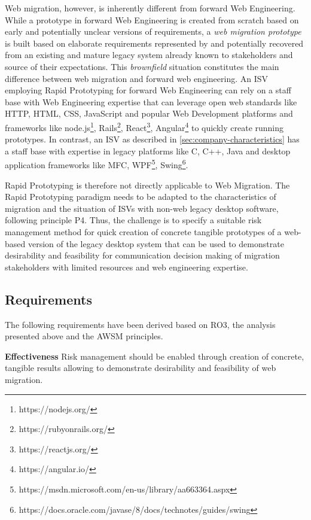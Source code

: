 Web migration, however, is inherently different from forward Web Engineering.
While a prototype in forward Web Engineering is created from scratch based on early and potentially unclear versions of requirements, a \emph{web migration prototype} is built based on elaborate requirements represented by and potentially recovered from an existing and mature legacy system already known to stakeholders and source of their expectations.
This \emph{brownfield} \autocite{Hopkins2008Brownfield} situation constitutes the main difference between web migration and forward web engineering.
An ISV employing Rapid Prototyping for forward Web Engineering can rely on a staff base with Web Engineering expertise that can leverage open web standards like HTTP, HTML, CSS, JavaScript and popular Web Development platforms and frameworks like node.js\footnote{https://nodejs.org/}, Rails\footnote{https://rubyonrails.org/}, React\footnote{https://reactjs.org/}, Angular\footnote{https://angular.io/} to quickly create running prototypes.
In contrast, an ISV as described in \cref{sec:company-characteristics} has a staff base with expertise in legacy platforms like C, C++, Java and desktop application frameworks like MFC, WPF\footnote{https://msdn.microsoft.com/en-us/library/aa663364.aspx}, Swing\footnote{https://docs.oracle.com/javase/8/docs/technotes/guides/swing}.

Rapid Prototyping is therefore not directly applicable to Web Migration.
The Rapid Prototyping paradigm needs to be adapted to the characteristics of migration and the situation of ISVs with non-web legacy desktop software, following principle P4.
Thus, the challenge is to specify a suitable risk management method for quick creation of concrete tangible prototypes of a web-based version of the legacy desktop system that can be used to demonstrate desirability and feasibility for communication decision making of migration stakeholders with limited resources and web engineering expertise.

\hypertarget{sec:rm.requirements}{%
\subsection{Requirements}\label{sec:rm.requirements}}

The following requirements have been derived based on RO3, the analysis presented above and the AWSM principles.

\textbf{Effectiveness} Risk management should be enabled through creation of concrete, tangible results allowing to demonstrate desirability and feasibility of web migration.

